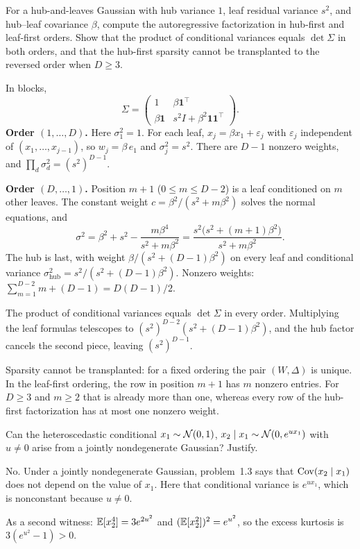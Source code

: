 \begin{hwqbox}
For a hub-and-leaves Gaussian with hub variance $1$, leaf residual variance $s^2$, and hub--leaf covariance $\beta$, compute the autoregressive factorization in hub-first and leaf-first orders. Show that the product of conditional variances equals $\det\Sigma$ in both orders, and that the hub-first sparsity cannot be transplanted to the reversed order when $D\ge 3$.
\end{hwqbox}
\begin{hwsolbox}
In blocks,
\[
\Sigma=\begin{pmatrix}1 & \beta\mathbf 1^\top\\ \beta\mathbf 1 & s^2 I+\beta^2\mathbf 1\mathbf 1^\top\end{pmatrix}.
\]
\textbf{Order $(1,\ldots,D)$.} Here $\sigma_1^2=1$. For each leaf, $x_j=\beta x_1+\varepsilon_j$ with $\varepsilon_j$ independent of $(x_1,\ldots,x_{j-1})$, so $w_j=\beta\,e_1$ and $\sigma_j^2=s^2$. There are $D-1$ nonzero weights, and $\prod_d\sigma_d^2=(s^2)^{D-1}$.

\textbf{Order $(D,\ldots,1)$.} Position $m+1$ ($0\le m\le D-2$) is a leaf conditioned on $m$ other leaves. The constant weight $c=\beta^2/(s^2+m\beta^2)$ solves the normal equations, and
\[
\sigma^2
=\beta^2+s^2-\frac{m\beta^4}{s^2+m\beta^2}
=\frac{s^2\big(s^2+(m+1)\beta^2\big)}{s^2+m\beta^2}.
\]
The hub is last, with weight $\beta/(s^2+(D-1)\beta^2)$ on every leaf and conditional variance $\sigma_{\mathrm{hub}}^2=s^2/(s^2+(D-1)\beta^2)$. Nonzero weights: $\sum_{m=1}^{D-2}m+(D-1)=D(D-1)/2$.

The product of conditional variances equals $\det\Sigma$ in every order. Multiplying the leaf formulas telescopes to $(s^2)^{D-2}(s^2+(D-1)\beta^2)$, and the hub factor cancels the second piece, leaving $(s^2)^{D-1}$.

Sparsity cannot be transplanted: for a fixed ordering the pair $(W,\Delta)$ is unique. In the leaf-first ordering, the row in position $m+1$ has $m$ nonzero entries. For $D\ge 3$ and $m\ge 2$ that is already more than one, whereas every row of the hub-first factorization has at most one nonzero weight.
\end{hwsolbox}

\begin{hwqbox}
Can the heteroscedastic conditional $x_1\sim\mathcal{N}(0,1)$, $x_2\mid x_1\sim\mathcal{N}(0,e^{ux_1})$ with $u\ne 0$ arise from a jointly nondegenerate Gaussian? Justify.
\end{hwqbox}
\begin{hwsolbox}
No. Under a jointly nondegenerate Gaussian, problem~1.3 says that $\mathrm{Cov}(x_2\mid x_1)$ does not depend on the value of $x_1$. Here that conditional variance is $e^{ux_1}$, which is nonconstant because $u\ne 0$.

As a second witness: $\mathbb{E}[x_2^4]=3e^{2u^2}$ and $(\mathbb{E}[x_2^2])^2=e^{u^2}$, so the excess kurtosis is $3(e^{u^2}-1)>0$.
\end{hwsolbox}

